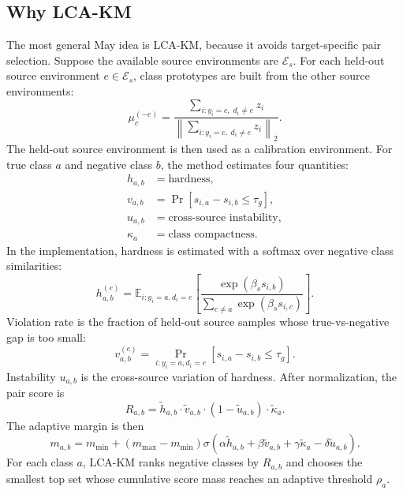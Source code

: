 \documentclass[11pt]{article}
\begin{document}
\subsection{Why LCA-KM}

The most general May idea is LCA-KM, because it avoids target-specific pair selection. Suppose the available source environments are $\mathcal{E}_s$. For each held-out source environment $e\in\mathcal{E}_s$, class prototypes are built from the other source environments:
\[
\mu_c^{(-e)}
=
\frac{
\sum_{i:y_i=c,\;d_i\neq e} z_i
}{
\left\|
\sum_{i:y_i=c,\;d_i\neq e} z_i
\right\|_2
}.
\]
The held-out source environment is then used as a calibration environment. For true class $a$ and negative class $b$, the method estimates four quantities:
\begin{align*}
h_{a,b} &= \text{hardness},\\
v_{a,b} &= \Pr[s_{i,a}-s_{i,b}\le \tau_g],\\
u_{a,b} &= \text{cross-source instability},\\
\kappa_a &= \text{class compactness}.
\end{align*}
In the implementation, hardness is estimated with a softmax over negative class similarities:
\[
h_{a,b}^{(e)}
=
\mathbb{E}_{i:y_i=a,d_i=e}
\left[
\frac{\exp(\beta_s s_{i,b})}
{\sum_{c\neq a}\exp(\beta_s s_{i,c})}
\right].
\]
Violation rate is the fraction of held-out source samples whose true-vs-negative gap is too small:
\[
v_{a,b}^{(e)}
=
\Pr_{i:y_i=a,d_i=e}
\left[
s_{i,a}-s_{i,b}\le \tau_g
\right].
\]
Instability $u_{a,b}$ is the cross-source variation of hardness. After normalization, the pair score is
\[
R_{a,b}
=
\widetilde{h}_{a,b}
\cdot
\widetilde{v}_{a,b}
\cdot
(1-\widetilde{u}_{a,b})
\cdot
\widetilde{\kappa}_a.
\]
The adaptive margin is then
\[
m_{a,b}
=
m_{\min}
+
(m_{\max}-m_{\min})
\sigma(
\alpha\widetilde{h}_{a,b}
+
\beta\widetilde{v}_{a,b}
+
\gamma\widetilde{\kappa}_a
-
\delta\widetilde{u}_{a,b}
).
\]
For each class $a$, LCA-KM ranks negative classes by $R_{a,b}$ and chooses the smallest top set whose cumulative score mass reaches an adaptive threshold $\rho_a$.
\end{document}
